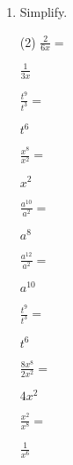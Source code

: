 \begin{enumerate} [leftmargin=0cm]
\item Simplify.
\begin{tasks}[label=(\alph*), after-item-skip=2pt,after-skip=3pt, label-width=4ex](2)
    \task  $ \frac{2}{6x}=                                     $            \begin{envFillIn} $  \frac{1}{3x}        $ \end{envFillIn}
    \task  $ \frac{t^9}{t^3}=                                  $            \begin{envFillIn} $  t^6                 $ \end{envFillIn}
    \task  $ \frac{x^8}{x^2}=                                  $            \begin{envFillIn} $  x^2                 $ \end{envFillIn}
    \task  $ \frac{a^{10}}{a^2}=                               $            \begin{envFillIn} $  a^8                 $ \end{envFillIn}
    \task  $ \frac{a^{12}}{a^2}=                               $            \begin{envFillIn} $  a^{10}              $ \end{envFillIn}
    \task  $ \frac{t^9}{t^3}=                                  $            \begin{envFillIn} $  t^6                 $ \end{envFillIn}
    \task  $ \frac{8x^8}{2x^2}=                                $            \begin{envFillIn} $  4x^2                $ \end{envFillIn}
    \task  $ \frac{x^2}{x^8}=                                  $            \begin{envFillIn} $  \frac{1}{x^6}       $ \end{envFillIn}
  
\end{tasks}


  


\end{enumerate}